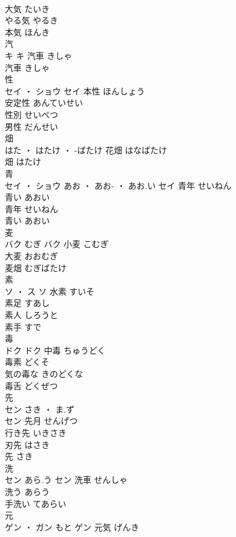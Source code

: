 \documentclass[8pt]{extreport}
\begin{document}
\begin{CJK}{UTF8}{min}
\\	大気	たいき	
\\	やる気	やるき	
\\	本気	ほんき	
\\	汽	
\\	キ		キ	汽車	きしゃ	
\\	汽車	きしゃ	
\\	性	
\\	セイ ・ ショウ		セイ	本性	ほんしょう	
\\	安定性	あんていせい	
\\	性別	せいべつ	
\\	男性	だんせい	
\\	畑	
\\	はた ・ はたけ ・ -ばたけ		花畑	はなばたけ	
\\	畑	はたけ	
\\	青	
\\	セイ ・ ショウ	あお ・ あお- ・ あお.い	セイ	青年	せいねん	
\\	青い	あおい	
\\	青年	せいねん	
\\	青い	あおい	
\\	麦	
\\	バク	むぎ	バク	小麦	こむぎ	
\\	大麦	おおむぎ	
\\	麦畑	むぎばたけ	
\\	素	
\\	ソ ・ ス		ソ	水素	すいそ	
\\	素足	すあし	
\\	素人	しろうと	
\\	素手	すで	
\\	毒	
\\	ドク		ドク	中毒	ちゅうどく	
\\	毒素	どくそ	
\\	気の毒な	きのどくな	
\\	毒舌	どくぜつ	
\\	先	
\\	セン	さき ・ ま.ず
\\	セン	先月	せんげつ	
\\	行き先	いきさき	
\\	刃先	はさき	
\\	先	さき	
\\	洗	
\\	セン	あら.う	セン	洗車	せんしゃ	
\\	洗う	あらう	
\\	手洗い	てあらい	
\\	元	
\\	ゲン ・ ガン	もと	ゲン	元気	げんき	

\end{CJK}
\end{document}
